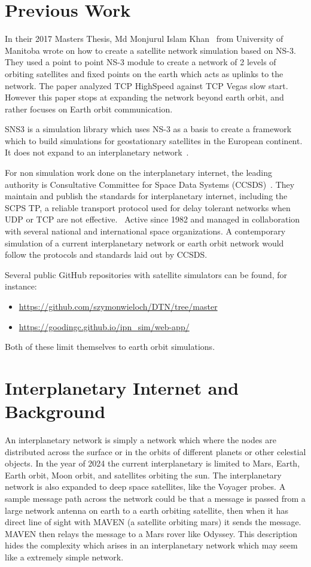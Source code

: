 \documentclass[a4paper,12pt]{article}
\begin{document}
\section{Previous Work}

In their 2017 Masters Thesis, Md Monjurul Islam Khan~\cite{Khan2017} from
University of Manitoba wrote on how to create a satellite network simulation
based on NS-3. They used a point to point NS-3 module to create a network of 2
levels of orbiting satellites and fixed points on the earth which acts as
uplinks to the network. The paper analyzed TCP HighSpeed against TCP Vegas slow
start. However this paper stops at expanding the network beyond earth orbit, and
rather focuses on Earth orbit communication.

SNS3 is a simulation library which uses NS-3 as a basis to create a framework
which to build simulations for geostationary satellites in the European
continent. It does not expand to an interplanetary network~\cite{Puttonen2014}.

For non simulation work done on the interplanetary internet, the leading
authority is Consultative Committee for Space Data Systems
(CCSDS)~\cite{CCSDS.org}. They maintain and publish the standards for
interplanetary internet, including the SCPS TP, a reliable transport protocol
used for delay tolerant networks when UDP or TCP are not
effective.~\cite{Keith2004} Active since 1982 and managed in collaboration with
several national and international space organizations. A contemporary
simulation of a current interplanetary network or earth orbit network would
follow the protocols and standards laid out by CCSDS.

Several public GitHub repositories with satellite simulators can be
found, for instance:
\begin{itemize}
\item\url{https://github.com/szymonwieloch/DTN/tree/master}
\item\url{https://goodingc.github.io/ipn_sim/web-app/}
\end{itemize}
Both of these limit themselves to earth orbit simulations.

\section{Interplanetary Internet and Background}

An interplanetary network is simply a network which where the nodes are
distributed across the surface or in the orbits of different planets or other
celestial objects. In the year of 2024 the current interplanetary is limited to
Mars, Earth, Earth orbit, Moon orbit, and satellites orbiting the sun. The
interplanetary network is also expanded to deep space satellites, like the
Voyager probes. A sample message path across the network could be that a message
is passed from a large network antenna on earth to a earth orbiting satellite,
then when it has direct line of sight with MAVEN (a satellite orbiting mars) it
sends the message. MAVEN then relays the message to a Mars rover like Odyssey.
This description hides the complexity which arises in an interplanetary network
which may seem like a extremely simple network.
\end{document}
